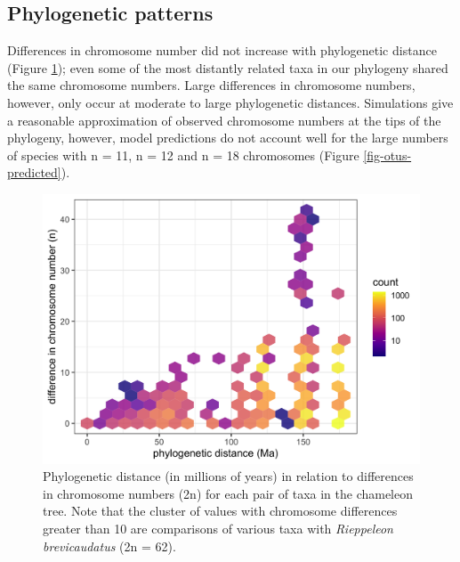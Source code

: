 \documentclass[a4paper, 12pt]{article}
\begin{document}
\subsection{Phylogenetic patterns}
Differences in chromosome number did not increase with phylogenetic distance (Figure \ref{fig-otus-pairwise}); even some of the most distantly related taxa in our phylogeny shared the same chromosome numbers. Large differences in chromosome numbers, however, only occur at moderate to large phylogenetic distances. Simulations give a reasonable approximation of observed chromosome numbers at the tips of the phylogeny, however, model predictions do not account well for the large numbers of species with n = 11, n = 12 and n = 18 chromosomes (Figure \ref{fig-otus-predicted}). 

\newpage
\begin{figure}[H]
 \centering
  \includegraphics[width = \linewidth]{figures/taxon-pairs-distances.png}
  \caption{Phylogenetic distance (in millions of years) in relation to differences in chromosome numbers (2n) for each pair of taxa in the chameleon tree. Note that the cluster of values with chromosome differences greater than 10 are comparisons of various taxa with \textit{Rieppeleon brevicaudatus} (2n = 62).
}
  \label{fig-otus-pairwise}
\end{figure} 
\end{document}
